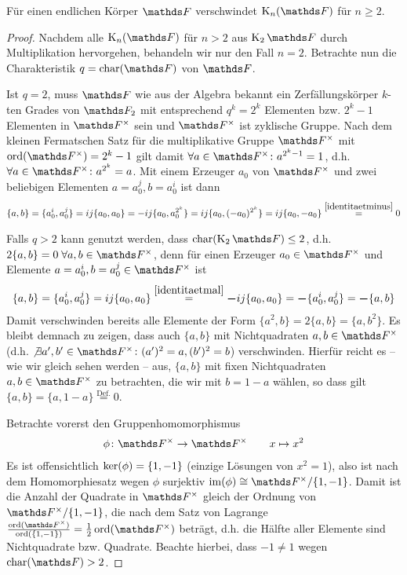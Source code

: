 \documentclass[ngerman,fontsize=11pt, paper=a4, parskip=half, titlepage=true, toc=bib]{scrartcl}
\begin{document}
\begin{Lem}
  Für einen endlichen Körper $\F$ verschwindet $\KnF$ für $n\geq 2$.
  \begin{proof}
    Nachdem alle $\KnF$ für $n>2$ aus $\K_2\F$ durch Multiplikation
    hervorgehen, behandeln wir nur den Fall $n=2$.
    Betrachte nun die Charakteristik $q=\Char(\F)$ von $\F$.

    Ist $q=2$, muss $\F$ wie aus der Algebra bekannt ein
    Zerfällungskörper $k$-ten Grades von $\F_2$ mit entsprechend
    $q^k=2^k$ Elementen bzw. $2^k-1$ Elementen in $\Fx$ sein und $\Fx$
    ist zyklische Gruppe.
    Nach dem kleinen Fermatschen Satz für die multiplikative Gruppe
    $\Fx$ mit $\Ord(\Fx)=2^k-1$ gilt damit $\forall a\in\Fx\colon a^{2^k-1}=1$, 
    d.h. $\forall a\in\Fx\colon a^{2^k} = a$.
    Mit einem Erzeuger $a_0$ von $\Fx$ und zwei beliebigen Elementen $a=a_0^j,
    b=a_0^i$ ist dann
    \begin{gather*}
      \{a,b\}=\{a_0^i, a_0^j\} = ij\{a_0,a_0\}
      = -ij\{a_0,a_0^{2^k}\} = ij\{a_0, (-a_0)^{2^k}\} =
      ij\{a_0,-a_0\} 
      \overset{\ref{identitaetminus}}{=} 0
    \end{gather*}

    Falls $q>2$ kann genutzt werden, dass $\Char(\K_2\F)\leq 2$, 
    d.h. $2\{a,b\}=0\;\forall a,b\in\Fx$,
    denn für einen Erzeuger $a_0\in\Fx$ und
    Elemente $a=a_0^i,b=a_0^j\in \Fx$ ist
    \begin{gather*}
      \{a,b\} = \{a_0^i,a_0^j\} = ij\{a_0,a_0\} 
      \overset{\ref{identitaetmal}}{=} \boldsymbol - ij\{a_0,a_0\}
      = \boldsymbol - \{a_0^i,a_0^j\} = \boldsymbol -\{a,b\} 
    \end{gather*}
    Damit verschwinden bereits alle Elemente der Form 
    $\{a^2,b\}=2\{a,b\}=\{a,b^2\}$. Es bleibt demnach zu zeigen, dass
    auch $\{a,b\}$ mit Nichtquadraten $a,b\in\Fx$
    (d.h. $\not\exists a',b'\in\Fx\colon (a')^2=a,(b')^2=b$)
    verschwinden.
    Hierfür reicht es – wie wir gleich sehen werden – aus,
    $\{a,b\}$ mit fixen Nichtquadraten
    $a,b\in\Fx$ zu betrachten, die wir mit $b=1-a$ wählen, so dass gilt
    $\{a,b\}=\{a,1-a\}\overset{\text{Def.}}{=}0$.
    
    Betrachte vorerst den Gruppenhomomorphismus
    \begin{gather*}
      \phi\colon\Fx \to \Fx
      \qquad x\mapsto x^2
    \end{gather*}
    Es ist offensichtlich $\operatorname{ker}(\phi)=\{1,-1\}$ (einzige Lösungen von
    $x^2=1$), also ist nach dem Homomorphiesatz wegen $\phi$ surjektiv
    $\im(\phi)\cong \Fx/\{1,-1\}$. Damit ist die Anzahl der Quadrate
    in $\Fx$ gleich der Ordnung von $\Fx/\{1,-1\}$, die nach dem Satz
    von Lagrange
    $\frac{\Ord(\Fx)}{\Ord(\{1,-1\})}=\frac{1}{2}\Ord(\Fx)$
    beträgt, d.h. die Hälfte aller Elemente sind Nichtquadrate
    bzw. Quadrate. Beachte hierbei, dass $-1\neq 1$ wegen $\Char(\F)>2$.


\end{proof}
\end{Lem}
\end{document}
